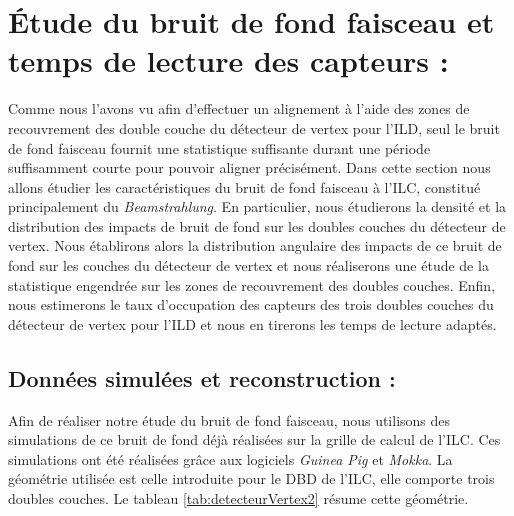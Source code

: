 % 
   \FloatBarrier

   \section{Étude du bruit de fond faisceau et temps de lecture des capteurs :}

Comme nous l'avons vu afin d'effectuer un alignement à l'aide des zones de recouvrement des double couche du détecteur de vertex pour l'ILD, seul le bruit de fond faisceau fournit une statistique suffisante durant une p\'eriode suffisamment courte pour pouvoir aligner pr\'ecis\'ement. Dans cette section nous allons \'etudier les caract\'eristiques du bruit de fond faisceau \`a l'ILC, constitu\'e principalement du \textit{Beamstrahlung}. En particulier, nous \'etudierons la densit\'e et la distribution des impacts de bruit de fond sur les doubles couches du d\'etecteur de vertex. Nous \'etablirons alors la distribution angulaire des impacts de ce bruit de fond sur les couches du d\'etecteur de vertex et nous r\'ealiserons une \'etude de la statistique engendr\'ee sur les zones de recouvrement des doubles couches. Enfin, nous estimerons le taux d'occupation des capteurs des trois doubles couches du d\'etecteur de vertex pour l'ILD et nous en tirerons les temps de lecture adapt\'es.

\subsection{Donn\'ees simul\'ees et reconstruction :}

Afin de r\'ealiser notre \'etude du bruit de fond faisceau, nous utilisons des simulations de ce bruit de fond d\'ej\`a r\'ealis\'ees sur la grille de calcul de l'ILC. Ces simulations ont \'et\'e r\'ealis\'ees gr\^ace aux logiciels \textit{Guinea Pig}\cite{Schulte:2007zz} et \textit{Mokka}\cite{Behnke:2007zz}. La g\'eom\'etrie utilis\'ee est celle introduite pour le DBD de l'ILC, elle comporte trois doubles couches. Le tableau \ref{tab:detecteurVertex2} r\'esume cette g\'eom\'etrie.

